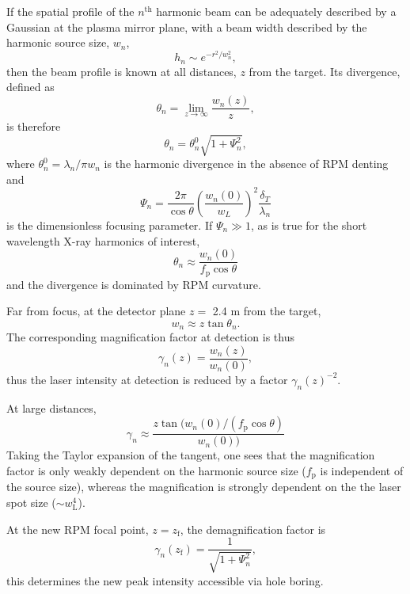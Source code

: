 If the spatial profile of the $n^\mathrm{th}$ harmonic beam can be adequately described by a Gaussian at the plasma mirror plane, with a beam width described by the harmonic source size, $w_n$,
\begin{equation}
	h_n \sim e^{-r^2/w_n^2},
\end{equation}
then the beam profile is known at all distances, $z$ from the target. Its divergence, defined as 
\begin{equation}
	\theta_n = \lim_{z\to\infty} \frac{w_n(z)}{z},
\end{equation}
is therefore
\begin{equation}
	\theta_n = \theta^0_n\sqrt{1+\Psi^2_n},
\end{equation}
where $\theta^0_n = \lambda_n/\pi w_n$ is the harmonic divergence in the absence of RPM denting and
\begin{equation}
	\Psi_n = \frac{2\pi}{\cos\theta}\left(\frac{w_n(0)}{w_L}\right)^2\frac{\delta_T}{\lambda_n}
\end{equation}
is the dimensionless focusing parameter. If $\Psi_n \gg 1$, as is true for the short wavelength X-ray harmonics of interest, 
\begin{equation}
	\theta_n \approx \frac{w_n(0)}{f_\mathrm{p}\cos\theta}
\end{equation}
and the divergence is dominated by RPM curvature. 

Far from focus, at the detector plane $z =$ 2.4 m from the target,
\begin{equation}
	w_{n} \approx z\tan\theta_n.
\end{equation}
The corresponding magnification factor at detection is thus 
\begin{equation}
	\gamma_n(z) = \frac{w_n(z)}{w_n(0)},
\end{equation}
thus the laser intensity at detection is reduced by a factor $\gamma_n(z)^{-2}$.

At large distances,
\begin{equation}
	\gamma_n \approx \frac{z\tan(w_n(0)/(f_\mathrm{p}\cos\theta)}{w_n(0))}
\end{equation}
Taking the Taylor expansion of the tangent, one sees that the magnification factor is only weakly dependent on the harmonic source size ($f_\mathrm{p}$ is independent of the source size), whereas the magnification is strongly dependent on the the laser spot size ($\sim w_\mathrm{L}^4$).

At the new \ac{RPM} focal point, $z = z_\mathrm{f}$, the demagnification factor is \cite{vincentiOpticalPropertiesRelativistic2014}
\begin{equation}
	\gamma_n(z_\mathrm{f}) = \frac{1}{\sqrt{1+\Psi_n^2}},
\end{equation}
this determines the new peak intensity accessible via hole boring.

